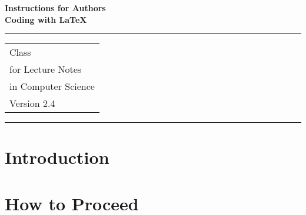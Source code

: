 \documentclass{llncs}
\begin{document}
\thispagestyle{empty}
\begin{flushleft}
\LARGE\bfseries Instructions for Authors\\
Coding with \LaTeX\\[2cm]
\end{flushleft}
\rule{\textwidth}{1pt}
\vspace{2pt}
\begin{flushright}
\Huge
\begin{tabular}{@{}l}
\LaTeXe{} Class\\
for Lecture Notes\\
in Computer Science\\[6pt]
{\Large Version 2.4}
\end{tabular}
\end{flushright}
\rule{\textwidth}{1pt}
\vfill
\newpage


%
\newpage
\tableofcontents
\newpage
%
\section{Introduction}
%

%
\section{How to Proceed}


\bibauthoryear
%
\end{document}
